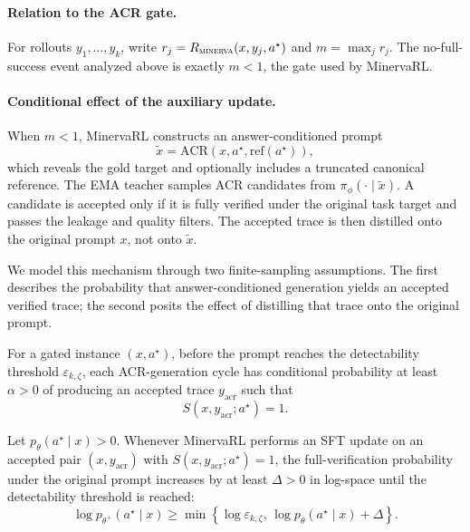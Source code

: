 \paragraph{Relation to the ACR gate.}
For rollouts $y_1,\ldots,y_k$, write $r_j=R_{\textsc{minerva}}(x,y_j,a^\star)$ and $m=\max_j r_j$. The
no-full-success event analyzed above is exactly $m<1$, the gate used by MinervaRL.

\paragraph{Conditional effect of the auxiliary update.}
When $m<1$, MinervaRL constructs an answer-conditioned prompt
\[
    \tilde{x}=\mathrm{ACR}(x,a^\star,\mathrm{ref}(a^\star)),
\]
which reveals the gold target and optionally includes a truncated canonical reference. The EMA teacher
samples ACR candidates from $\pi_\phi(\cdot\mid \tilde{x})$. A candidate is accepted only if it is fully
verified under the original task target and passes the leakage and quality filters. The accepted trace
is then distilled onto the original prompt $x$, not onto $\tilde{x}$.

We model this mechanism through two finite-sampling assumptions. The first describes the probability
that answer-conditioned generation yields an accepted verified trace; the second posits the effect of
distilling that trace onto the original prompt.

\begin{assumption}
\label{ass:exposure}
For a gated instance $(x,a^\star)$, before the prompt reaches the detectability threshold
$\varepsilon_{k,\zeta}$, each ACR-generation cycle has conditional probability at least $\alpha>0$
of producing an accepted trace $y_{\mathrm{acr}}$ such that
\begin{equation}
    S(x,y_{\mathrm{acr}};a^\star)=1 .
\end{equation}
\end{assumption}

\begin{assumption}
\label{ass:distill}
Let $p_\theta(a^\star\mid x)>0$. Whenever MinervaRL performs an SFT update on an accepted pair
$(x,y_{\mathrm{acr}})$ with $S(x,y_{\mathrm{acr}};a^\star)=1$, the full-verification probability under
the original prompt increases by at least $\Delta>0$ in log-space until the detectability threshold is
reached:
\begin{equation}
    \log p_{\theta^+}(a^\star\mid x)
    \ge
    \min\!\left\{
        \log \varepsilon_{k,\zeta},\,
        \log p_\theta(a^\star\mid x)+\Delta
    \right\}.
\end{equation}
\end{assumption}


